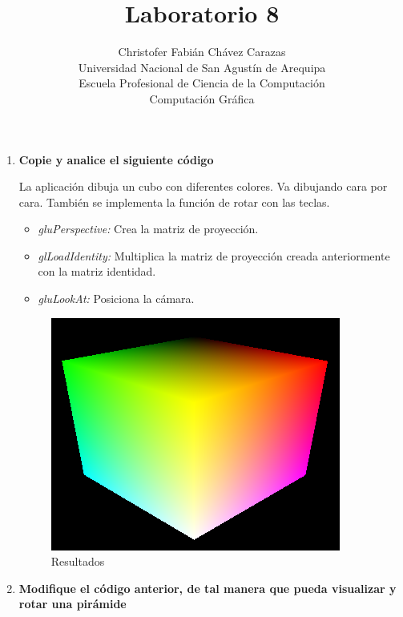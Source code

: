 \documentclass[a4paper,12pt]{article}
\begin{document}
\title{Laboratorio 8}
\author{
Christofer Fabián Chávez Carazas \\
\small{Universidad Nacional de San Agustín de Arequipa} \\
\small{Escuela Profesional de Ciencia de la Computación} \\
\small{Computación Gráfica}
}
\date{}

\maketitle

\begin{enumerate}
 \item \textbf{Copie y analice el siguiente código}
 
 La aplicación dibuja un cubo con diferentes colores. Va dibujando cara por cara. También se implementa la función de rotar con las teclas.
 
 \begin{itemize}
  \item \textit{gluPerspective:} Crea la matriz de proyección.
  \item \textit{glLoadIdentity:} Multiplica la matriz de proyección creada anteriormente con la matriz identidad.
  \item \textit{gluLookAt:} Posiciona la cámara.
 \end{itemize}
 
 \begin{figure}[H]
  \centering
  \includegraphics[scale = 0.5]{1.png}
  \caption{Resultados}
 \end{figure}

 \item \textbf{Modifique el código anterior, de tal manera que pueda visualizar y rotar una pirámide}
 

\end{enumerate}
\end{document}
